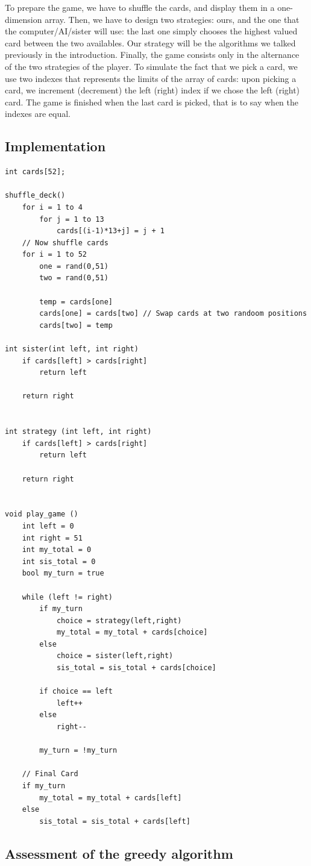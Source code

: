 \documentclass[11pt]{article}
\begin{document}
To prepare the game, we have to shuffle the cards, and display them in a one-dimension array.
Then, we have to design two strategies: ours, and the one that the computer/AI/sister will use: the last one simply chooses the highest valued card between the two availables.
Our strategy will be the algorithms we talked previously in the introduction.
Finally, the game consists only in the alternance of the two strategies of the player.
To simulate the fact that we pick a card, we use two indexes that represents the limits of the array of cards: upon picking a card, we increment (decrement) the left (right) index if we chose the left (right) card. The game is finished when the last card is picked, that is to say when the indexes are equal.

\subsection{Implementation}
\begin{lstlisting}
int cards[52];

shuffle_deck()
	for i = 1 to 4
		for j = 1 to 13
			cards[(i-1)*13+j] = j + 1
	// Now shuffle cards
	for i = 1 to 52
		one = rand(0,51)
		two = rand(0,51)

		temp = cards[one]
		cards[one] = cards[two] // Swap cards at two randoom positions
		cards[two] = temp

int sister(int left, int right)
	if cards[left] > cards[right]
		return left
	
	return right


int strategy (int left, int right)
	if cards[left] > cards[right]
		return left

	return right


void play_game ()
	int left = 0
	int right = 51
	int my_total = 0
	int sis_total = 0
	bool my_turn = true

	while (left != right)
		if my_turn
			choice = strategy(left,right)
			my_total = my_total + cards[choice]
		else
			choice = sister(left,right)
			sis_total = sis_total + cards[choice]

		if choice == left
			left++
		else
			right--

		my_turn = !my_turn

	// Final Card
	if my_turn
		my_total = my_total + cards[left]
	else
		sis_total = sis_total + cards[left]
\end{lstlisting}

\subsection{Assessment of the greedy algorithm}
\end{document}
